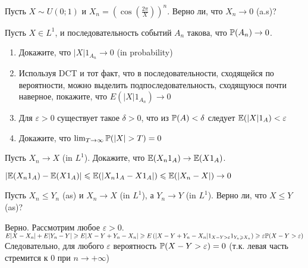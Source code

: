 \begin{problem}
Пусть $X\sim U(0;1)$ и $X_{n}=(\cos(\frac{2\pi}{X}))^{n}$. Верно
ли, что
$X_{n}\rightarrow 0$ (a.s)?

\begin{sol}

\end{sol}
\end{problem}

\begin{problem}
Пусть $X\in L^{1}$, и последовательность событий $A_{n}$ такова,
что $\P(A_{n})\rightarrow 0$.
\begin{enumerate}
\item Докажите, что $|X| 1_{A_{n}} \rightarrow 0$ (in probability)
\item Используя DCT и тот факт, что в последовательности, сходящейся
по вероятности, можно выделить подпоследовательность, сходящуюся
почти наверное, покажите, что $E\left(|X| 1_{A_{n}}\right)
\rightarrow 0$
\item Для $\varepsilon>0$ существует такое $\delta>0$,
что из $\P(A)<\delta$ следует $\E(|X|1_{A})<\varepsilon$
\item Докажите, что $\lim_{T\to\infty}\P(|X|>T)=0$
\end{enumerate}

\begin{sol}

\end{sol}
\end{problem}

\begin{problem}
Пусть $X_{n}\rightarrow X$ (in $L^{1}$). Докажите, что
$\E(X_{n}1_{A})\rightarrow \E(X 1_{A})$.

\begin{sol}

$|\E(X_{n}1_{A})-\E(X 1_{A})|\le \E(|X_{n}1_{A}-X 1_{A}|)\le
\E(|X_{n}-X|)\rightarrow 0$
\end{sol}
\end{problem}

\begin{problem}
Пусть $X_{n}\le Y_{n}$ (as) и $X_{n}\rightarrow X$ (in $L^{1}$), а
$Y_{n}\rightarrow Y$ (in $L^{1}$). Верно ли, что $X\le Y$ (as)?

\begin{sol}

Верно. Рассмотрим любое $\varepsilon>0$. \\
$E|X-X_{n}|+E|Y_{n}-Y|\ge E|X-Y+Y_{n}-X_{n}|\ge E\left(
|X-Y+Y_{n}-X_{n}| 1_{X-Y>\varepsilon}1_{Y_{n}\ge X_{n}}\right)\ge
\varepsilon \P(X-Y>\varepsilon)$ \\
Следовательно, для любого $\varepsilon$ вероятность
$\P(X-Y>\varepsilon)=0$ (т.к. левая часть стремится к 0 при
$n\rightarrow +\infty$)
\end{sol}
\end{problem}

